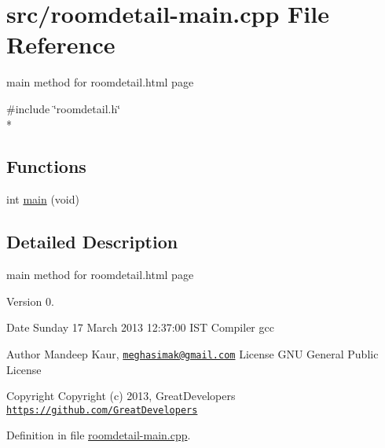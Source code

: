 \hypertarget{roomdetail-main_8cpp}{\section{src/roomdetail-\/main.cpp File Reference}
\label{roomdetail-main_8cpp}
}


main method for roomdetail.\-html page  


{\ttfamily \#include \char`\"{}roomdetail.\-h\char`\"{}}\\*
\subsection*{Functions}
\begin{DoxyCompactItemize}
\item 
int \hyperlink{roomdetail-main_8cpp_a840291bc02cba5474a4cb46a9b9566fe}{main} (void)
\end{DoxyCompactItemize}


\subsection{Detailed Description}
main method for roomdetail.\-html page \begin{DoxyVersion}{Version}
0. 
\end{DoxyVersion}
\begin{DoxyDate}{Date}
Sunday 17 March 2013 12\-:37\-:00 I\-S\-T Compiler gcc
\end{DoxyDate}
\begin{DoxyAuthor}{Author}
Mandeep Kaur, \href{mailto:meghasimak@gmail.com}{\tt meghasimak@gmail.\-com} License G\-N\-U General Public License 
\end{DoxyAuthor}
\begin{DoxyCopyright}{Copyright}
Copyright (c) 2013, Great\-Developers \href{https://github.com/GreatDevelopers}{\tt https\-://github.\-com/\-Great\-Developers} 
\end{DoxyCopyright}


Definition in file \hyperlink{roomdetail-main_8cpp_source}{roomdetail-\/main.\-cpp}.



